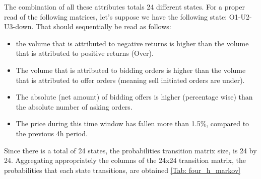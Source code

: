 The combination of all these attributes totals 24 different states. For a proper read of the following matrices, let’s suppose we have the following state: O1-U2-U3-down. That should sequentially be read as follows: 

\begin{itemize}
\item the volume that is attributed to negative returns is higher than the volume that is attributed to positive returns (Over).
\item The volume that is attributed to bidding orders is higher than the volume that is attributed to offer orders (meaning sell initiated orders are under).
\item The absolute (net amount) of bidding offers is higher (percentage wise) than the absolute number of asking orders.
\item The price during this time window has fallen more than 1.5\%, compared to the previous 4h period.
\end{itemize}

Since there is a total of 24 states, the probabilities transition matrix size, is 24 by 24. Aggregating appropriately the columns of the 24x24 transition matrix, the probabilities that each state transitions, are obtained \ref{Tab: four_h_markov}



